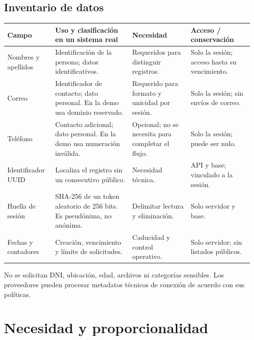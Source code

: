 \documentclass[11pt,a4paper]{article}
\renewcommand{\arraystretch}{1.22}
\begin{document}
\subsection{Inventario de datos}
{\small
\renewcommand{\arraystretch}{1.08}
\begin{tabularx}{\textwidth}{@{}P{2.2cm}YP{2.5cm}P{2.9cm}@{}}
\toprule
\textbf{Campo} & \textbf{Uso y clasificación en un sistema real} & \textbf{Necesidad} & \textbf{Acceso / conservación}\\
\midrule
Nombres y apellidos & Identificación de la persona; datos identificativos. & Requeridos para distinguir registros. & Solo la sesión; acceso hasta su vencimiento.\\
Correo & Identificador de contacto; dato personal. En la demo usa dominio reservado. & Requerido para formato y unicidad por sesión. & Solo la sesión; sin envíos de correo.\\
Teléfono & Contacto adicional; dato personal. En la demo usa numeración inválida. & Opcional; no se necesita para completar el flujo. & Solo la sesión; puede ser nulo.\\
Identificador UUID & Localiza el registro sin un consecutivo público. & Necesidad técnica. & API y base; vinculado a la sesión.\\
Huella de sesión & SHA-256 de un token aleatorio de 256 bits. Es pseudónima, no anónima. & Delimitar lectura y eliminación. & Solo servidor y base.\\
Fechas y contadores & Creación, vencimiento y límite de solicitudes. & Caducidad y control operativo. & Solo servidor; sin listados públicos.\\
\bottomrule
\end{tabularx}}
No se solicitan DNI, ubicación, edad, archivos ni categorías sensibles. Los proveedores pueden procesar metadatos técnicos de conexión de acuerdo con sus políticas.

\newpage
\section{Necesidad y proporcionalidad}
\end{document}
